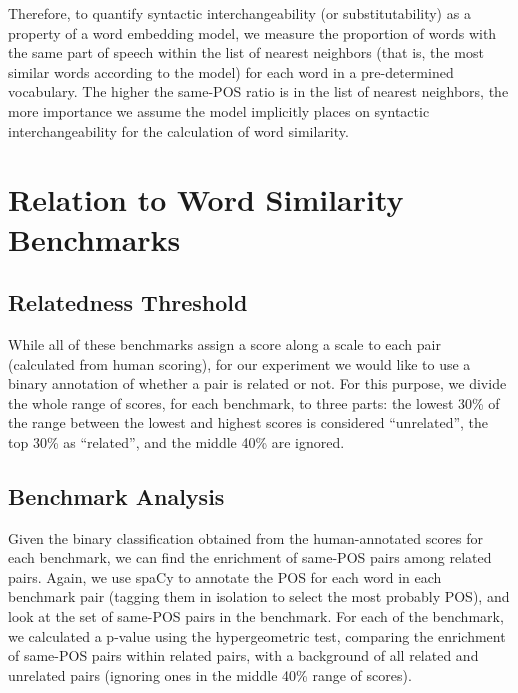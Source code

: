 \documentclass[11pt,a4paper]{article}
\begin{document}
    Therefore, to quantify syntactic interchangeability (or substitutability)
    as a property of a word embedding model,
    we measure the proportion of words with the same part of speech
    within the list of nearest neighbors
    (that is, the most similar words according to the model)
    for each word in a pre-determined vocabulary.
    The higher the same-POS ratio is in the list of nearest neighbors,
    the more importance we assume the model implicitly places on syntactic interchangeability
    for the calculation of word similarity.
    
    
    
    \section{Relation to Word Similarity Benchmarks}\label{sec:benchmarks}


    \subsection{Relatedness Threshold}\label{sec:threshold}
    
    While all of these benchmarks assign a score along a scale to each pair
    (calculated from human scoring), for our experiment we would like to use
    a binary annotation of whether a pair is related or not.
    For this purpose, we divide the whole range of scores,
    for each benchmark, to three parts:
    the lowest 30\% of the range between the lowest and highest scores
    is considered ``unrelated'', the top 30\% as ``related'',
    and the middle 40\% are ignored.
    
    \subsection{Benchmark Analysis}\label{benchmark_analysis}
    
    Given the binary classification obtained from the human-annotated scores
    for each benchmark, we can find the enrichment of same-POS pairs among
    related pairs.
    Again, we use spaCy to annotate the POS for each word in each benchmark
    pair (tagging them in isolation to select the most probably POS),
    and look at the set of same-POS pairs in the benchmark.
    For each of the benchmark, we calculated a p-value using the hypergeometric
    test, comparing the enrichment of same-POS pairs within related pairs,
    with a background of all related and unrelated pairs (ignoring ones in
    the middle 40\% range of scores).
    
\end{document}
